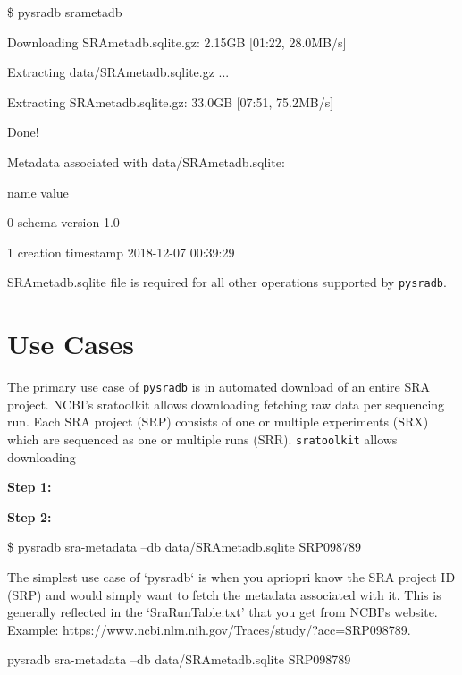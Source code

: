 \documentclass[9pt,a4paper]{extarticle}
\newenvironment{allintypewriter}{\ttfamily}{\par}
\begin{document}
\begin{allintypewriter}
\$ pysradb srametadb

Downloading SRAmetadb.sqlite.gz: 2.15GB [01:22, 28.0MB/s]   

Extracting data/SRAmetadb.sqlite.gz ...

Extracting SRAmetadb.sqlite.gz: 33.0GB [07:51, 75.2MB/s]

Done!

Metadata associated with data/SRAmetadb.sqlite:

                 name                value

0      schema version                  1.0

1  creation timestamp  2018-12-07 00:39:29

\end{allintypewriter}

SRAmetadb.sqlite file is required for all other operations supported
by \texttt{pysradb}.


\section*{Use Cases} %
The primary use case of \texttt{pysradb} is in automated download of an entire
SRA project. NCBI's sratoolkit \cite{ncbisratoolit} allows downloading fetching 
raw data per sequencing run. Each SRA project (SRP) consists of one or multiple 
experiments (SRX) which are sequenced as one or multiple runs (SRR). 
\texttt{sratoolkit} allows downloading 


\textbf{Step 1: }


\textbf{Step 2:}

\begin{allintypewriter}
\$ pysradb sra-metadata --db data/SRAmetadb.sqlite SRP098789 


\end{allintypewriter}

The simplest use case of `pysradb` is when you apriopri know the SRA project ID 
(SRP) and would simply want to fetch the metadata associated with it. This is
generally reflected in the `SraRunTable.txt' that you get from NCBI's website.
Example: https://www.ncbi.nlm.nih.gov/Traces/study/?acc=SRP098789.

\begin{allintypewriter}
pysradb sra-metadata --db data/SRAmetadb.sqlite SRP098789
\end{allintypewriter}
\end{document}
